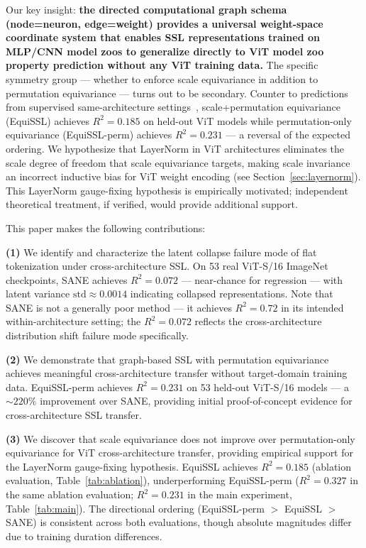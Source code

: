 Our key insight:
\textbf{the directed computational graph schema (node=neuron, edge=weight)
provides a universal weight-space coordinate system that enables SSL representations
trained on MLP/CNN model zoos to generalize directly to ViT model zoo property prediction
without any ViT training data.}
The specific symmetry group --- whether to enforce scale equivariance in addition to
permutation equivariance --- turns out to be secondary.
Counter to predictions from supervised same-architecture
settings~\cite{Kalogeropoulos2024Scale},
scale+permutation equivariance (EquiSSL) achieves $R^2 = 0.185$ on held-out ViT models
while permutation-only equivariance (EquiSSL-perm) achieves $R^2 = 0.231$ ---
a reversal of the expected ordering.
We hypothesize that LayerNorm in ViT architectures eliminates the scale degree of freedom
that scale equivariance targets, making scale invariance an incorrect inductive bias for
ViT weight encoding (see Section~\ref{sec:layernorm}).
This LayerNorm gauge-fixing hypothesis is empirically motivated;
independent theoretical treatment, if verified, would provide additional support.

This paper makes the following contributions:

\textbf{(1)} We identify and characterize the latent collapse failure mode of flat tokenization
under cross-architecture SSL.
On 53 real ViT-S/16 ImageNet checkpoints, SANE achieves $R^2 = 0.072$ --- near-chance
for regression --- with latent variance $\text{std} \approx 0.0014$ indicating collapsed
representations.
Note that SANE is not a generally poor method --- it achieves $R^2 = 0.72$ in its intended
within-architecture setting; the $R^2 = 0.072$ reflects the cross-architecture distribution
shift failure mode specifically.

\textbf{(2)} We demonstrate that graph-based SSL with permutation equivariance achieves meaningful
cross-architecture transfer without target-domain training data.
EquiSSL-perm achieves $R^2 = 0.231$ on 53 held-out ViT-S/16 models ---
a ${\sim}220\%$ improvement over SANE, providing initial proof-of-concept evidence for
cross-architecture SSL transfer.

\textbf{(3)} We discover that scale equivariance does not improve over permutation-only equivariance
for ViT cross-architecture transfer, providing empirical support for the LayerNorm
gauge-fixing hypothesis.
EquiSSL achieves $R^2 = 0.185$ (ablation evaluation, Table~\ref{tab:ablation}),
underperforming EquiSSL-perm ($R^2 = 0.327$ in the same ablation evaluation;
$R^2 = 0.231$ in the main experiment, Table~\ref{tab:main}).
The directional ordering (EquiSSL-perm $>$ EquiSSL $>$ SANE) is consistent across both
evaluations, though absolute magnitudes differ due to training duration differences.

